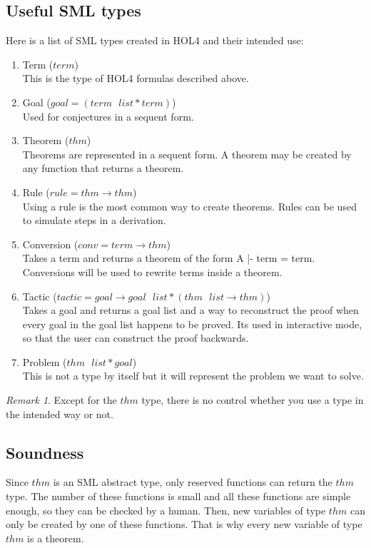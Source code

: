 \documentclass[a4paper, 11pt]{article}
\theoremstyle{plain}
\theoremstyle{definition}
\theoremstyle{remark}
\newtheorem*{remark}{Remark}
\begin{document}
\subsection{Useful SML types}
  Here is a list of SML types created in HOL4 and their intended use:
\begin {enumerate}  
  \item Term ($term$)
\\This is the type of HOL4 formulas described above. 
  \item Goal ($goal = (term\mbox{ }list * term)$)
\\Used for conjectures in a sequent form.
  \item Theorem ($thm$) 
\\Theorems are represented in a sequent form. A theorem may be created by any function that returns a theorem.
  \item Rule ($rule = thm \rightarrow thm$)
\\Using a rule is the most common way to create theorems. Rules can be used to simulate steps in a derivation. 
  \item Conversion ($conv = term \rightarrow thm$)
\\Takes a term and returns a theorem of the form A |- term = term. Conversions will be used to rewrite terms inside a theorem.
  \item Tactic ($tactic = goal \rightarrow goal\mbox{ }list * (thm\mbox{ }list \rightarrow thm)$)
\\Takes a goal and returns a goal list and a way to reconstruct the proof when every goal in the goal list happens to be proved. Its used in interactive mode, so that the user can construct the proof backwards.
  \item Problem ($thm\mbox{ }list * goal$)
\\This is not a type by itself but it will represent the problem we want to solve.
\end{enumerate}

\begin{remark} Except for the $thm$ type, there is no control whether you use a type in the intended way or not.
\end{remark}

\subsection{Soundness}
  Since $thm$ is an SML abstract type, only reserved functions can return the $thm$ type. The number of these functions is small and all these functions are simple enough, so they can be checked by a human. Then, new variables of type $thm$ can only be created by one of these functions. That is why every new variable of type $thm$ is a theorem.
\end{document}
